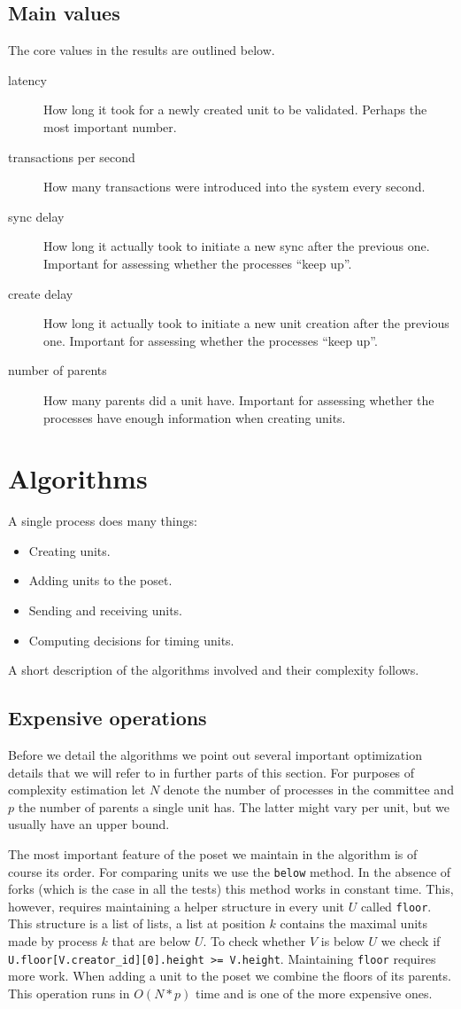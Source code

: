 \documentclass[a4paper,10pt]{article}
\begin{document}
		\subsection{Main values}
			The core values in the results are outlined below.
			\begin{description}
				\item[latency] How long it took for a newly created unit to be validated. Perhaps the most important number.
				\item[transactions per second] How many transactions were introduced into the system every second.
				\item[sync delay] How long it actually took to initiate a new sync after the previous one. Important for assessing whether the processes ``keep up''.
				\item[create delay] How long it actually took to initiate a new unit creation after the previous one. Important for assessing whether the processes ``keep up''.
				\item[number of parents] How many parents did a unit have. Important for assessing whether the processes have enough information when creating units.
			\end{description}
	\section{Algorithms}
		A single process does many things:
		\begin{itemize}
			\item Creating units.
			\item Adding units to the poset.
			\item Sending and receiving units.
			\item Computing decisions for timing units.
		\end{itemize}
		A short description of the algorithms involved and their complexity follows.
		\subsection{Expensive operations}
		 Before we detail the algorithms we point out several important optimization details that we will refer to in further parts of this section.
			For purposes of complexity estimation let $N$ denote the number of processes in the committee and $p$ the number of parents a single unit has.
			The latter might vary per unit, but we usually have an upper bound.

			The most important feature of the poset we maintain in the algorithm is of course its order.
			For comparing units we use the \lstinline{below} method. In the absence of forks (which is the case in all the tests) this method works in constant time.
			This, however, requires maintaining a helper structure in every unit $U$ called \lstinline{floor}.
			This structure is a list of lists, a list at position $k$ contains the maximal units made by process $k$ that are below $U$.
			To check whether $V$ is below $U$ we check if \lstinline{U.floor[V.creator_id][0].height >= V.height}.
			Maintaining \lstinline{floor} requires more work. When adding a unit to the poset we combine the floors of its parents.
			This operation runs in $O(N*p)$ time and is one of the more expensive ones.
\end{document}
